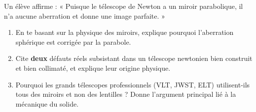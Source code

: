 \documentclass[11pt]{article}
\begin{document}
\begin{exercice}
Un élève affirme : « Puisque le télescope de Newton a un miroir parabolique, il n'a aucune aberration et donne une image parfaite. »
\begin{enumerate}
    \item En te basant sur la physique des miroirs, explique pourquoi l'aberration sphérique est corrigée par la parabole.
    \item Cite \textbf{deux} défauts réels subsistant dans un télescope newtonien bien construit et bien collimaté, et explique leur origine physique.
    \item Pourquoi les grands télescopes professionnels (VLT, JWST, ELT) utilisent-ils tous des miroirs et non des lentilles ? Donne l'argument principal lié à la mécanique du solide.
\end{enumerate}
\end{exercice}
\end{document}

